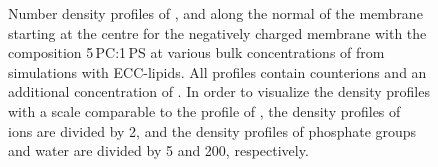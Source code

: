 \documentclass[journal=jpcbfk,manuscript=article]{achemso}
\begin{document}
\begin{figure}[htbp!]
{    Number density profiles of ,  and  along the normal of the membrane starting at the centre
    for the negatively charged membrane with the composition 5\,PC:1\,PS
    at various bulk concentrations of  from simulations with ECC-lipids. 
    All profiles contain  counterions and an additional concentration of . 
    In order to visualize the density profiles with a scale comparable to the profile of ,  
    the density profiles of~ ions are divided by 2, and 
    the density profiles of phosphate groups and water are divided by 5 and 200, respectively.  
  }
\end{figure} 

%


\end{document}
